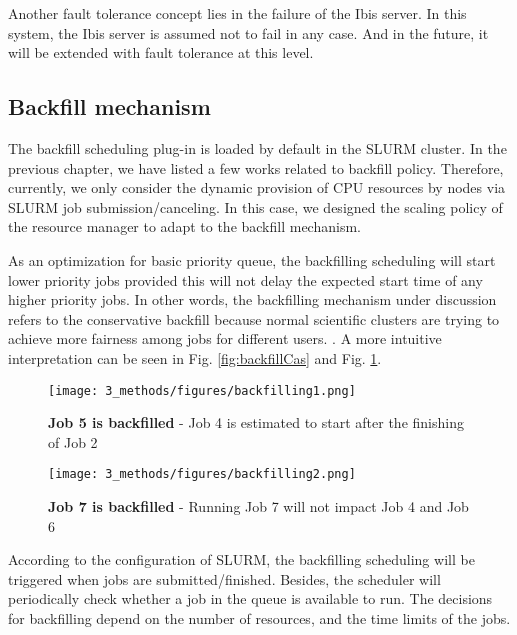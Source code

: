 Another fault tolerance concept lies in the failure of the Ibis server. In this system, the Ibis server is assumed not to fail in any case. And in the future, it will be extended with fault tolerance at this level.

\subsection{Backfill mechanism}\label{sec:backfill}
The backfill scheduling plug-in is loaded by default in the SLURM cluster. 
In the previous chapter, we have listed a few works related to backfill policy. 
Therefore, currently, we only consider the dynamic provision of CPU resources by nodes via SLURM job submission/canceling.
In this case, we designed the scaling policy of the resource manager to adapt to the backfill mechanism.

As an optimization for basic priority queue, the backfilling scheduling will start lower priority jobs provided this will not  delay the expected start time of any higher priority jobs. 
In other words, the backfilling mechanism under discussion refers to the conservative backfill because normal scientific clusters are trying to achieve more fairness among jobs for different users. 
. A more intuitive interpretation can be seen in Fig. \ref{fig:backfillCas} and Fig. \ref{fig:backfillCase}.
\begin{figure}
    \centering
    \begin{minipage}{.45\textwidth}
      \centering
      \texttt{[image: 3\_methods/figures/backfilling1.png]}
      \caption[Backfill case 1]{{\small\textbf{Job 5 is backfilled} - Job 4 is estimated to start after the finishing of Job 2}}
      \label{fig:backfillCas}
    \end{minipage} 
    \begin{minipage}{.45\textwidth}
      \centering
      \texttt{[image: 3\_methods/figures/backfilling2.png]}
      \caption[Backfill case 2]{{\small\textbf{Job 7 is backfilled} - Running Job 7 will not impact Job 4 and Job 6 }}
      \label{fig:backfillCase}
    \end{minipage}
\end{figure}
According to the configuration of SLURM, the backfilling scheduling will be triggered when jobs are submitted/finished. 
Besides, the scheduler will periodically check whether a job in the queue is available to run.
The decisions for backfilling depend on the number of resources, and the time limits of the jobs. 


